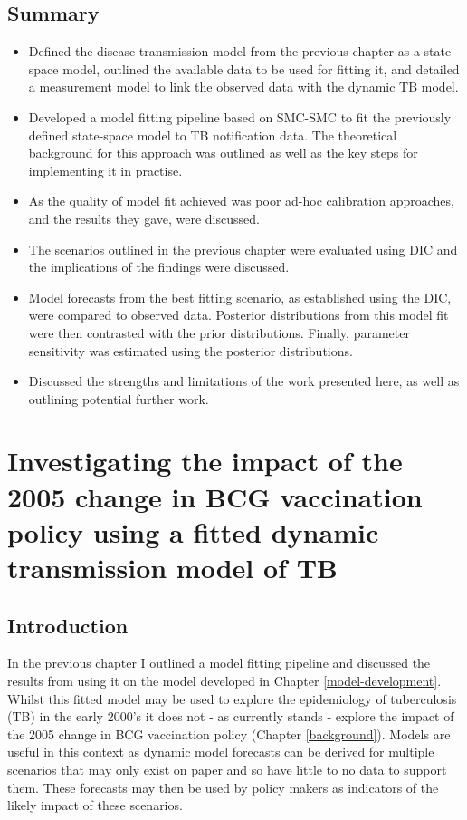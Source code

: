 \documentclass[11pt,twoside]{bristolthesis}
\providecommand{\tightlist}{%
  \setlength{\itemsep}{0pt}\setlength{\parskip}{0pt}}
\begin{document}
  \hypertarget{summary-8}{%
  \section{Summary}\label{summary-8}}
  \begin{itemize}
  \tightlist
  \item
    Defined the disease transmission model from the previous chapter as a state-space model, outlined the available data to be used for fitting it, and detailed a measurement model to link the observed data with the dynamic TB model.
  \item
    Developed a model fitting pipeline based on SMC-SMC to fit the previously defined state-space model to TB notification data. The theoretical background for this approach was outlined as well as the key steps for implementing it in practise.
  \item
    As the quality of model fit achieved was poor ad-hoc calibration approaches, and the results they gave, were discussed.
  \item
    The scenarios outlined in the previous chapter were evaluated using DIC and the implications of the findings were discussed.
  \item
    Model forecasts from the best fitting scenario, as established using the DIC, were compared to observed data. Posterior distributions from this model fit were then contrasted with the prior distributions. Finally, parameter sensitivity was estimated using the posterior distributions.
  \item
    Discussed the strengths and limitations of the work presented here, as well as outlining potential further work.
  \end{itemize}
  \hypertarget{model-results}{%
  \chapter{Investigating the impact of the 2005 change in BCG vaccination policy using a fitted dynamic transmission model of TB}\label{model-results}}
  
  \hypertarget{introduction-8}{%
  \section{Introduction}\label{introduction-8}}
  
  In the previous chapter I outlined a model fitting pipeline and discussed the results from using it on the model developed in Chapter \ref{model-development}. Whilst this fitted model may be used to explore the epidemiology of tuberculosis (TB) in the early 2000's it does not - as currently stands - explore the impact of the 2005 change in BCG vaccination policy (Chapter \ref{background}). Models are useful in this context as dynamic model forecasts can be derived for multiple scenarios that may only exist on paper and so have little to no data to support them. These forecasts may then be used by policy makers as indicators of the likely impact of these scenarios.
  
\end{document}
